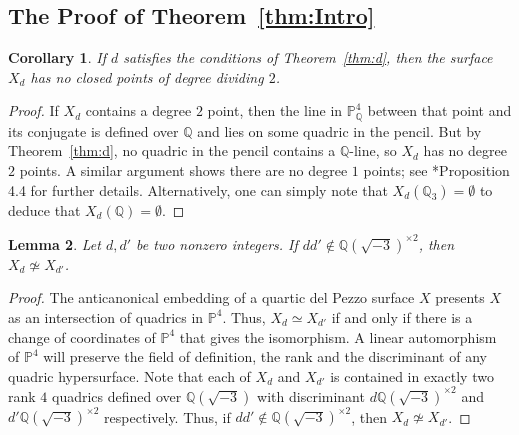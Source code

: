 \documentclass[12pt, reqno]{amsart}
\newtheorem{lemma}{Lemma}
\newtheorem{cor}[lemma]{Corollary}
\theoremstyle{definition}
\newcommand{\PP}{{\mathbb P}}
\newcommand{\Q}{{\mathbb Q}}
\begin{document}
\subsection{The Proof of Theorem~\ref{thm:Intro}}\label{sec:proof}
\begin{cor}\label{cor:main}
	If $d$ satisfies the conditions of Theorem~\ref{thm:d}, then the surface $X_d$ has no closed points of degree dividing $2$.
\end{cor}
\begin{proof}
	If $X_d$ contains a degree $2$ point, then the line in $\PP^4_\Q$ between that point and its conjugate is defined over $\Q$ and lies on some quadric in the pencil. But by Theorem~\ref{thm:d}, no quadric in the pencil contains a $\Q$-line, so $X_d$ has no degree $2$ points. A similar argument shows there are no degree $1$ points; see \cite{CV}*{Proposition 4.4} for further details. Alternatively, one can simply note that $X_d(\Q_3) = \emptyset$ to deduce that $X_d(\Q) = \emptyset$.
\end{proof}
\begin{lemma}\label{lem:Nonisomorphic}
   Let \(d, d'\) be two nonzero integers. If \(dd'\notin \Q(\sqrt{-3})^{\times2}\), then \(X_d\not\simeq X_{d'}\).
\end{lemma}
\begin{proof}
   The anticanonical embedding of a quartic del Pezzo surface \(X\) presents \(X\) as an intersection of quadrics in \(\PP^4\).  Thus, \(X_d\simeq X_{d'}\) if and only if there is a change of coordinates of \(\PP^4\) that gives the isomorphism. A linear automorphism of \(\PP^4\) will preserve the field of definition, the rank and the discriminant of any quadric hypersurface. Note that each of \(X_d\) and \(X_{d'}\) is contained in exactly two rank \(4\) quadrics defined over \(\Q(\sqrt{-3})\) with discriminant \(d\Q(\sqrt{-3})^{\times2}\) and \(d'\Q(\sqrt{-3})^{\times2}\) respectively. Thus, if \(dd'\notin \Q(\sqrt{-3})^{\times2}\), then \(X_d\not\simeq X_{d'}\).
\end{proof}
\end{document}
